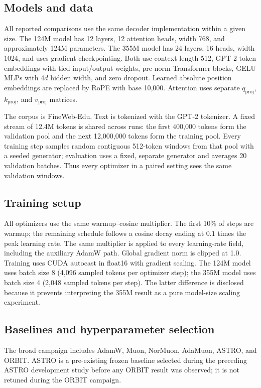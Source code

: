 \subsection{Models and data}
All reported comparisons use the same decoder implementation within a given size. The
124M model has 12 layers, 12 attention heads, width 768, and approximately 124M parameters.
The 355M model has 24 layers, 16 heads, width 1024, and uses gradient checkpointing. Both
use context length 512, GPT-2 token embeddings with tied input/output weights, pre-norm
Transformer blocks, GELU MLPs with $4d$ hidden width, and zero dropout. Learned absolute
position embeddings are replaced by RoPE with base 10,000. Attention uses separate
$q_{\mathrm{proj}}$, $k_{\mathrm{proj}}$, and $v_{\mathrm{proj}}$ matrices.

The corpus is FineWeb-Edu. Text is tokenized with the GPT-2
tokenizer. A fixed stream of 12.4M tokens is shared across runs: the first 400,000 tokens
form the validation pool and the next 12,000,000 tokens form the training pool. Every training step
samples random contiguous 512-token windows from that pool with a seeded generator;
evaluation uses a fixed, separate generator and averages 20 validation batches. Thus every
optimizer in a paired setting sees the same validation windows.

\subsection{Training setup}
\label{sec:training-setup}
All optimizers use the same warmup--cosine multiplier. The first 10\% of steps are warmup;
the remaining schedule follows a cosine decay ending at $0.1$ times the peak learning rate.
The same multiplier is applied to every learning-rate field, including the auxiliary AdamW
path. Global gradient norm is clipped at 1.0. Training uses CUDA autocast in float16 with
gradient scaling. The 124M model uses batch size 8 (4,096 sampled tokens per optimizer
step); the 355M model uses batch size 4 (2,048 sampled tokens per step). The latter
difference is disclosed because it prevents interpreting the 355M result as a pure
model-size scaling experiment.

\subsection{Baselines and hyperparameter selection}
The broad campaign includes AdamW, Muon, NorMuon, AdaMuon, ASTRO, and ORBIT. ASTRO is a
pre-existing frozen baseline selected during the preceding ASTRO development study before
any ORBIT result was observed; it is not retuned during the ORBIT campaign.

